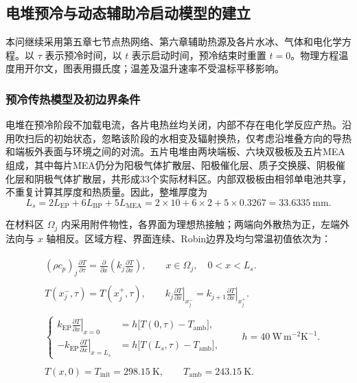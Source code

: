 \documentclass[bwprint]{gmcmthesis}
\numberwithin{equation}{section}
\numberwithin{figure}{section}
\begin{document}
\subsection{电堆预冷与动态辅助冷启动模型的建立}

本问继续采用第五章七节点热网络、第六章辅助热源及各片水冰、气体和电化学方程。以 $\tau$ 表示预冷时间，以 $t$ 表示启动时间，预冷结束时重置 $t=0$。物理方程温度用开尔文，图表用摄氏度；温差及温升速率不受温标平移影响。

\subsubsection{预冷传热模型及初边界条件}

电堆在预冷阶段不加载电流，各片电热丝均关闭，内部不存在电化学反应产热。沿用吹扫后的初始状态，忽略该阶段的水相变及辐射换热，仅考虑沿堆叠方向的导热和端板外表面与环境之间的对流。五片电堆由两块端板、六块双极板及五片MEA组成，其中每片MEA仍分为阳极气体扩散层、阳极催化层、质子交换膜、阴极催化层和阴极气体扩散层，共形成33个实际材料区。内部双极板由相邻单电池共享，不重复计算其厚度和热质量。因此，整堆厚度为
\begin{equation}
L_s=2L_{\mathrm{EP}}+6L_{\mathrm{BP}}+5L_{\mathrm{MEA}}
=2\times10+6\times2+5\times0.3267=33.6335\ \mathrm{mm}.
\label{eq:q4:stack_length}
\end{equation}

在材料区 $\Omega_j$ 内采用附件物性，各界面为理想热接触；两端向外散热为正，左端外法向与 $x$ 轴相反。区域方程、界面连续、Robin边界及均匀常温初值依次为：

\begin{align}
&
\begin{gathered}
(\rho c_p)_j\frac{\partial T}{\partial\tau}
=\frac{\partial}{\partial x}\left(k_j\frac{\partial T}{\partial x}\right),
\qquad x\in\Omega_j,\quad 0<x<L_s.
\end{gathered}
\label{eq:q4:precool_pde}\\
&
\begin{gathered}
T(x_j^-,\tau)=T(x_j^+,\tau),\qquad
k_j\left.\frac{\partial T}{\partial x}\right|_{x_j^-}
=k_{j+1}\left.\frac{\partial T}{\partial x}\right|_{x_j^+}.
\end{gathered}
\label{eq:q4:precool_interface}\\
&
\begin{gathered}
\left\{\begin{aligned}
k_{\mathrm{EP}}\left.\frac{\partial T}{\partial x}\right|_{x=0}
&=h\big[T(0,\tau)-T_{\mathrm{amb}}\big],\\
-k_{\mathrm{EP}}\left.\frac{\partial T}{\partial x}\right|_{x=L_s}
&=h\big[T(L_s,\tau)-T_{\mathrm{amb}}\big],
\end{aligned}\right.
\qquad h=40\ \mathrm{W\,m^{-2}K^{-1}}.
\end{gathered}
\label{eq:q4:precool_robin}\\
&
\begin{gathered}
T(x,0)=T_{\mathrm{init}}=298.15\ \mathrm K,\qquad
T_{\mathrm{amb}}=243.15\ \mathrm K.
\end{gathered}
\label{eq:q4:precool_initial}
\end{align}
\end{document}
